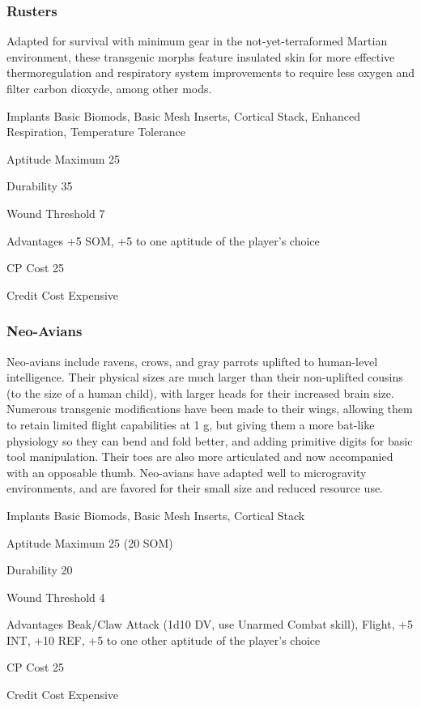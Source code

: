 \subsubsection{Rusters} \label{sec:starting-rusters} 

Adapted for survival with minimum gear in the not-yet-terraformed Martian environment, these transgenic morphs feature insulated skin for more effective thermoregulation and respiratory system improvements to require less oxygen and filter carbon dioxyde, among other mods. 

\begin{description*} \item[Implants] Basic Biomods, Basic Mesh Inserts, Cortical Stack, Enhanced Respiration, Temperature Tolerance \item[Aptitude Maximum] 25 \item[Durability] 35 \item[Wound Threshold] 7 \item[Advantages] +5 SOM, +5 to one aptitude of the player’s choice \item[CP Cost] 25 \item[Credit Cost] Expensive \end{description*} 

\subsubsection{Neo-Avians} \label{sec:starting-neo-avians} 

Neo-avians include ravens, crows, and gray parrots uplifted to human-level intelligence. Their physical sizes are much larger than their non-uplifted cousins (to the size of a human child), with larger heads for their increased brain size. Numerous transgenic modifications have been made to their wings, allowing them to retain limited flight capabilities at 1 g, but giving them a more bat-like physiology so they can bend and fold better, and adding primitive digits for basic tool manipulation. Their toes are also more articulated and now accompanied with an opposable thumb. Neo-avians have adapted well to microgravity environments, and are favored for their small size and reduced resource use. 

\begin{description*} \item[Implants] Basic Biomods, Basic Mesh Inserts, Cortical Stack \item[Aptitude Maximum] 25 (20 SOM) \item[Durability] 20 \item[Wound Threshold] 4 \item[Advantages] Beak/Claw Attack (1d10 DV, use Unarmed Combat skill), Flight, +5 INT, +10 REF, +5 to one other aptitude of the player’s choice \item[CP Cost] 25 \item[Credit Cost] Expensive \end{description*} 

